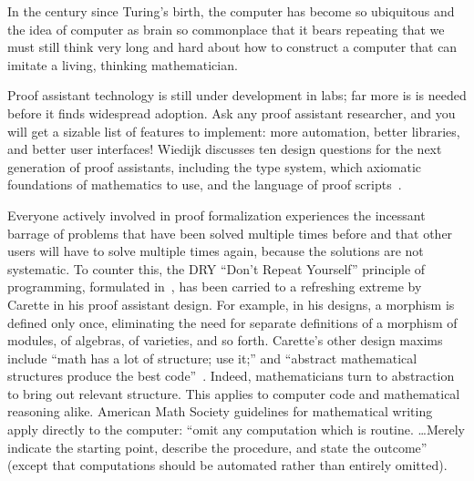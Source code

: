 \documentclass{llncs}
\def\princ#1{\smallskip\hfill\break\smallskip\centerline{\it #1\hfill}}
\begin{document}
In the century since Turing's birth, the computer has become so
ubiquitous and the idea of computer as brain so commonplace that it
bears repeating that we must still think very long and hard about how
to construct a computer that can imitate a living, thinking
mathematician.


Proof assistant technology is still under development in labs; far
more is is needed before it finds widespread adoption.  Ask any proof
assistant researcher, and you will get a sizable list of features to
implement: more automation, better libraries, and better user
interfaces!  Wiedijk discusses ten design questions for the next
generation of proof assistants, including the type system, which
axiomatic foundations of mathematics to use, and the language of proof
scripts~\cite{Wie10}.

Everyone actively involved in proof formalization experiences the
incessant barrage of problems that have been solved multiple times
before and that other users will have to solve multiple times again,
because the solutions are not systematic.  To counter this, the DRY
``Don't Repeat Yourself'' principle of programming, formulated
in~\cite{PP00}, has been carried to a refreshing extreme by Carette in
his proof assistant design.  For example, in his designs, a morphism
is defined only once, eliminating the need for separate definitions of
a morphism of modules, of algebras, of varieties, and so forth.
Carette's other design maxims include ``math has a lot of structure;
use it;'' and ``abstract mathematical structures produce the best
code''~\cite{Car28p}.  Indeed, mathematicians turn to abstraction to
bring out relevant structure. This applies to computer code and
mathematical reasoning alike.  American Math Society guidelines for
mathematical writing apply directly to the computer: ``omit any
computation which is routine. \dots Merely indicate the starting
point, describe the procedure, and state the outcome''~\cite{DCFPS}
(except that computations should be automated rather than entirely
omitted).




\end{document}
